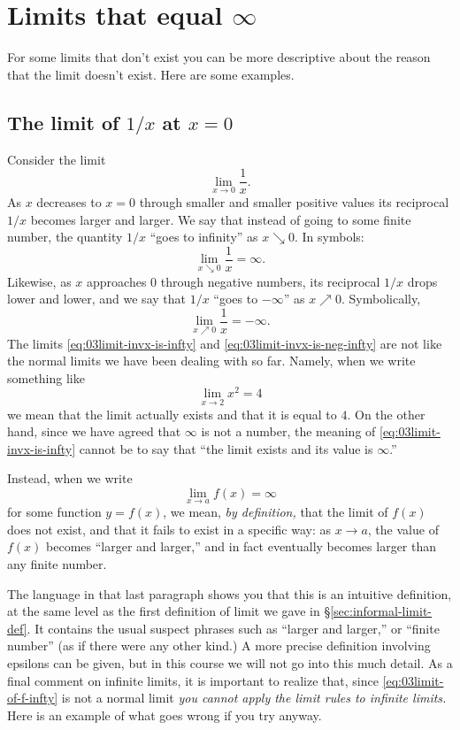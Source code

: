 \section{Limits that equal $\infty$}
\label{sec:03limits-that-equal-infty}
For some limits that don't exist you can be more descriptive about the
reason that the limit doesn't exist.  Here are some examples.

\subsection{The limit of $1/x$ at $x=0$}
\label{sec:limit-1x-at-zero}
Consider the limit
\[
\lim_{x\to 0} \frac{1} {x}.
\]
As $x$ decreases to $x=0$ through smaller and smaller positive values
its reciprocal $1/x$ becomes larger and larger.  We say that instead
of going to some finite number, the quantity $1/x$ ``goes to
infinity'' as $x\searrow0$.  In symbols:
\begin{equation}
  \lim_{x\searrow 0} \frac{1} {x} = \infty.
  \label{eq:03limit-invx-is-infty}  
\end{equation}%
\marginpar{ }%
Likewise, as $x$ approaches $0$ through negative numbers, its
reciprocal $1/x$ drops lower and lower, and we say that $1/x$ ``goes
to $-\infty$'' as $x\nearrow 0$.  Symbolically,
\begin{equation}
  \label{eq:03limit-invx-is-neg-infty}
    \lim_{x\nearrow 0} \frac{1} {x} = -\infty.
\end{equation}
The limits \eqref{eq:03limit-invx-is-infty} and
\eqref{eq:03limit-invx-is-neg-infty} are not like the normal limits we
have been dealing with so far.  Namely, when we write something like
\[
\lim_{x\to2} x^2 = 4
\]
we mean that the limit actually exists and that it is equal to $4$.
On the other hand, since we have agreed that $\infty$ is not a number,
the meaning of \eqref{eq:03limit-invx-is-infty} cannot be to say that
``the limit exists and its value is $\infty$.''

Instead, when we write
\begin{equation}
  \lim_{x\to a} f(x) = \infty
  \label{eq:03limit-of-f-infty}
\end{equation}
for some function $y=f(x)$, we mean, \emph{by definition,} that the
limit of $f(x)$ does not exist, and that it fails to exist in a
specific way: as $x\to a$, the value of $f(x)$ becomes ``larger and
larger,'' and in fact eventually becomes larger than any finite
number.

The language in that last paragraph shows you that this is an
intuitive definition, at the same level as the first definition of
limit we gave in \S\ref{sec:informal-limit-def}.  It contains the
usual suspect phrases such as ``larger and larger,'' or ``finite
number'' (as if there were any other kind.)  A more precise definition
involving epsilons can be given, but in this course we will not go
into this much detail.  As a final comment on infinite limits, it is
important to realize that, since \eqref{eq:03limit-of-f-infty} is not
a normal limit \emph{you cannot apply the limit rules to infinite
  limits. }  Here is an example of what goes wrong if you try anyway.

